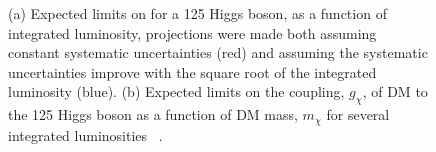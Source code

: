 \begin{figure}

  \caption{(a) Expected limits on \BRinv for a 125 \GeV Higgs boson, as a function of integrated luminosity, projections were made both assuming constant systematic uncertainties (red) and assuming the systematic uncertainties improve with the square root of the integrated luminosity (blue). (b) Expected limits on the coupling, $g_{\chi}$, of \ac{DM} to the 125 \GeV Higgs boson as a function of \ac{DM} mass, $m_{\chi}$ for several integrated luminosities ~\cite{ourdmpaper}.}
  \label{fig:smprojectedlimits}
\end{figure}

